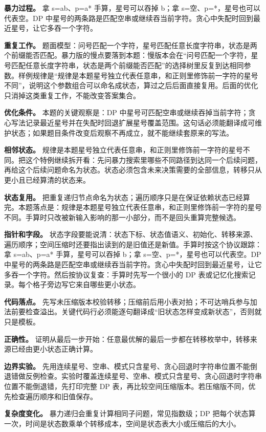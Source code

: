 \textbf{暴力过程。} 拿 s=ab、p=a* 手算，星号可以吞掉 b；拿 s=空、p=*，星号也可以代表空。DP 中星号的两条路是匹配空串或继续吞当前字符。贪心中失配时回到最近星号，让它多吞一个字符。

\textbf{重复工作。} 题面模型：问号匹配一个字符，星号匹配任意长度字符串，状态是两个前缀能否匹配。暴力版的慢点要落到本题：慢版本会在“问号匹配一个字符，星号匹配任意长度字符串，状态是两个前缀能否匹配”的选择树里反复到达相同参数。样例规律是“规律是本题星号独立代表任意串，和正则里修饰前一字符的星号不同”，说明这个参数组合可以命名成状态，算过之后后面直接复用。后面的优化只消掉这类重复工作，不能改变答案集合。

\textbf{优化条件。} 本题的关键观察是：DP 中星号可匹配空串或继续吞掉当前字符；贪心写法记录最近星号并在失配时回退扩展星号覆盖范围。这句话必须能翻译成可维护状态；如果题目条件改变后观察不再成立，就不能继续套原来的写法。

\textbf{相邻状态。} 规律是本题星号独立代表任意串，和正则里修饰前一字符的星号不同。把这个特例继续拆开看：先问暴力搜索里哪些不同路径到达同一个后续问题，再给这个后续问题命名为状态。状态必须包含未来决策需要的全部信息，转移只从更小且已经算清的状态来。

\textbf{状态复用。} 把重复递归节点命名为状态；遍历顺序只是在保证依赖状态已经算完。本题落点是：规律是本题星号独立代表任意串，和正则里修饰前一字符的星号不同。手算时只改被新输入影响的那一小部分，而不是回头重算完整候选。

\textbf{指针和字段。} 状态字段要能说清：状态下标、状态值语义、初始化、转移来源、遍历顺序；空间压缩时还要指出读到的是旧值还是新值。手算时按这个协议跟踪：拿 s=ab、p=a* 手算，星号可以吞掉 b；拿 s=空、p=*，星号也可以代表空。DP 中星号的两条路是匹配空串或继续吞当前字符。贪心中失配时回到最近星号，让它多吞一个字符。然后按协议复查：手算时先写一个很小的 DP 表或记忆化搜索记录。每个格子旁边写它来自哪些更小状态。

\textbf{代码落点。} 先写未压缩版本校验转移；压缩前后用小表对拍；不可达哨兵参与加法前要检查溢出。关键代码行必须能逐句翻译成“旧状态怎样变成新状态”，否则就只是模板。

\textbf{正确性。} 证明从最后一步开始：任意最优解的最后一步都在转移枚举中，转移来源已经由更小状态正确计算。

\textbf{边界实验。} 先用连续星号、空串、模式只含星号、贪心回退时字符串位置不能倒退错做反例检查。实验时覆盖连续星号、空串、模式只含星号、贪心回退时字符串位置不能倒退错，先打印完整 DP 表，再比较空间压缩版本。若压缩版不同，优先检查遍历顺序和旧值保存。

\textbf{复杂度变化。} 暴力递归会重复计算相同子问题，常见指数级；DP 把每个状态算一次，时间是状态数乘单个转移成本，空间是状态表大小或压缩后的大小。


